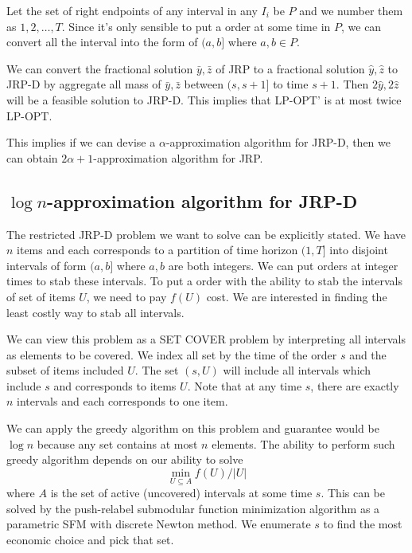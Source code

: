 Let the set of right endpoints of any interval in any $I_i$ be $P$ and we number them as $1,2,\ldots, T$. Since it's only sensible to put a order at some time in $P$, we can convert all the interval into the form of $(a, b]$ where $a,b \in P$.

\begin{lem}
We can convert the fractional solution $\bar y, \bar z$ of JRP to a fractional solution $\hat y, \hat z$ to JRP-D by aggregate all mass of $\bar y, \bar z$ between $(s, s+1]$ to time $s+1$. Then $2\hat y, 2\hat z$ will be a feasible solution to JRP-D. This implies that LP-OPT' is at most twice LP-OPT.
\end{lem}

This implies if we can devise a $\alpha$-approximation algorithm for JRP-D, then we can obtain $2\alpha+1$-approximation algorithm for JRP.

\subsection{$\log n$-approximation algorithm for JRP-D}
The restricted JRP-D problem we want to solve can be explicitly stated. We have $n$ items and each corresponds to a partition of time horizon $(1,T]$ into disjoint intervals of form $(a,b]$ where $a,b$ are both integers. We can put orders at integer times to stab these intervals. To put a order with the ability to stab the intervals of set of items $U$, we need to pay $f(U)$ cost. We are interested in finding the least costly way to stab all intervals.

We can view this problem as a SET COVER problem by interpreting all intervals as elements to be covered. We index all set by the time of the order $s$ and the subset of items included $U$. The set $(s, U)$ will include all intervals which include $s$ and corresponds to items $U$. Note that at any time $s$, there are exactly $n$ intervals and each corresponds to one item.

We can apply the greedy algorithm on this problem and guarantee would be $\log n$ because any set contains at most $n$ elements. The ability to perform such greedy algorithm depends on our ability to solve
\[	\min_{U \subseteq A} f(U)/|U|	\]
where $A$ is the set of active (uncovered) intervals at some time $s$. This can be solved by the push-relabel submodular function minimization algorithm as a parametric SFM with discrete Newton method. We enumerate $s$ to find the most economic choice and pick that set.